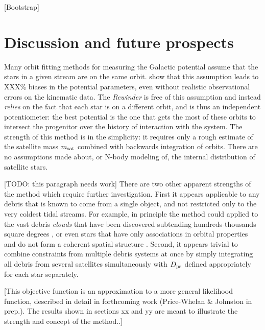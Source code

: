 \documentclass[preprint]{aastex}
\begin{document}
[Bootstrap]


\section{Discussion and future prospects}

Many orbit fitting methods for measuring the Galactic potential assume that the stars in a given stream are on the same
orbit. \cite{binney??} show that this assumption leads to XXX\% biases in the 
potential parameters, even without realistic observational errors on
the kinematic data. The \emph{Rewinder} is
free of this assumption and instead \emph{relies} on the fact that
each star is on a different orbit, and is thus an independent potentiometer: the best potential is the one that gets the
most of these orbits to intersect the progenitor
over the history of interaction with the system. The strength of this method is in the simplicity: it requires only a rough estimate of the satellite mass $m_{\rm sat}$ combined with backwards integration of orbits. There are no assumptions made about, or N-body modeling of, the internal distribution of satellite stars.

[TODO: this paragraph needs work]
There are two other apparent strengths of the method which require further investigation.
First it appears applicable to any debris that is known to come from a single object, and not restricted only to the very coldest tidal streams. For example, in principle the
method could  applied to the vast debris {\it clouds} that have been discovered subtending hundreds-thousands square degrees \citep[e.g. the Triangulum Andromeda
and Hercules-Aquila clouds]{rochapinto04,belokurov06}, or even stars that have only associations in orbital properties and do not form a coherent spatial structure
\citep[such as the angular momentum groupings in local giants found by][]{helmi99}.
Second, it appears trivial to combine constraints from multiple debris systems at once by simply integrating all debris from several satellites simultaneously with $D_{\rm
ps}$ defined appropriately for each star separately.

[This objective function is an approximation to a more general likelihood function, described in detail in forthcoming work (Price-Whelan \& Johnston in prep.). The results shown in sections xx and yy are meant to illustrate the strength and concept of the method..]
\end{document}
